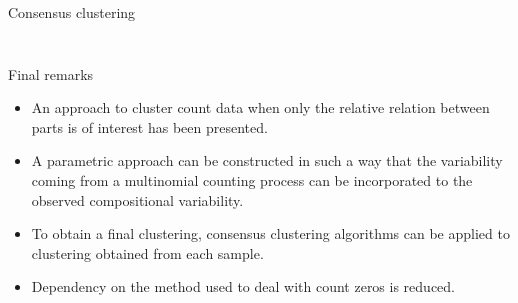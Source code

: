 \documentclass[9pt]{beamer}
\begin{document}
\begin{frame}[t]{Consensus clustering}
\begin{columns}
\begin{column}{0.5\textwidth}
\begin{figure}
\end{figure}
\end{column}
\end{columns}

\end{frame}


\begin{frame}{Final remarks}

\begin{itemize}
\item An approach to cluster count data when only the relative relation between parts is of interest has been presented.\vspace{0.2cm}
\item A parametric approach can be constructed in such a way that the variability coming from a multinomial counting process can be incorporated to the observed compositional variability.\vspace{0.2cm}
\item To obtain a final clustering, consensus clustering algorithms can be applied to clustering obtained  from each sample.
\item Dependency on the method used to deal with count zeros is reduced.
\end{itemize}
\end{frame}
\end{document}
